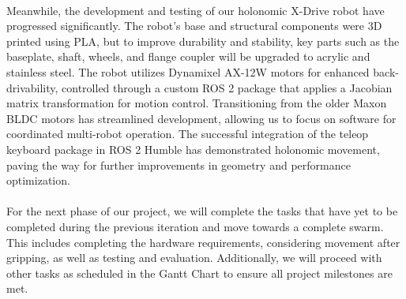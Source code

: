 \paragraph*{}
Meanwhile, the development and testing of our holonomic X-Drive robot have progressed significantly. The robot’s base and structural components were 3D printed using PLA, but to improve durability and stability, key parts such as the baseplate, shaft, wheels, and flange coupler will be upgraded to acrylic and stainless steel. The robot utilizes Dynamixel AX-12W motors for enhanced back-drivability, controlled through a custom ROS 2 package that applies a Jacobian matrix transformation for motion control. Transitioning from the older Maxon BLDC motors has streamlined development, allowing us to focus on software for coordinated multi-robot operation. The successful integration of the teleop keyboard package in ROS 2 Humble has demonstrated holonomic movement, paving the way for further improvements in geometry and performance optimization.

\paragraph*{}
For the next phase of our project, we will complete the tasks that have yet to be completed during the previous iteration and move towards a complete swarm. This includes completing the hardware requirements, considering movement after gripping, as well as testing and evaluation. Additionally, we will proceed with other tasks as scheduled in the Gantt Chart to ensure all project milestones are met.
